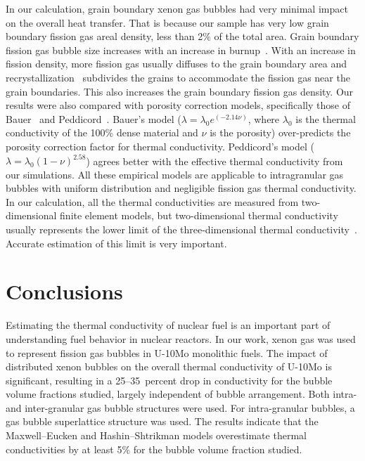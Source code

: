 In our calculation, grain boundary xenon gas bubbles had very minimal impact on the overall heat transfer. That is because our sample has very low grain boundary fission gas areal density, less than 2$\%$ of the total area. Grain boundary fission gas bubble size increases with an increase in burnup~\cite{kim2011fission}.
With an increase in fission density, more fission gas usually diffuses to the grain boundary area and recrystallization~\cite{kim2013recrystallization} subdivides the grains to accommodate the fission gas near the grain boundaries.
This also increases the grain boundary fission gas density. Our results were also compared with porosity correction models, specifically those of Bauer~\cite{bauer1995pile} and Peddicord~\cite{peddicord1978porosity}. Bauer's model ($\lambda=\lambda_0 e^{(-2.14\nu)}$, where $\lambda_0$ is the thermal conductivity of the 100\% dense material and $\nu$ is the porosity) over-predicts the porosity correction factor for thermal conductivity. Peddicord's model ($\lambda=\lambda_0(1-\nu)^{2.58}$) agrees better with the effective thermal conductivity from our simulations. All these empirical models are applicable to intragranular gas bubbles with uniform distribution and negligible fission gas thermal conductivity. In our calculation, all the thermal conductivities are measured from two-dimensional finite element models, but two-dimensional thermal conductivity usually represents the lower limit of the three-dimensional thermal conductivity~\cite{bakker1995determination}. Accurate estimation of this limit is very important. 

\section{\label{sec:conclusion}Conclusions}
Estimating the thermal conductivity of nuclear fuel is an important part of understanding fuel behavior in nuclear reactors. In our work, xenon gas was used to represent fission gas bubbles in U-10Mo monolithic fuels. The impact of distributed xenon bubbles on the overall thermal conductivity of U-10Mo is significant, resulting in a 25--35~percent drop in conductivity for the bubble volume fractions studied, largely independent of bubble arrangement. Both intra- and inter-granular gas bubble structures were used. For intra-granular bubbles, a gas bubble superlattice structure was used. The results indicate that the Maxwell--Eucken and Hashin--Shtrikman models overestimate thermal conductivities by at least 5\% for the bubble volume fraction studied.


